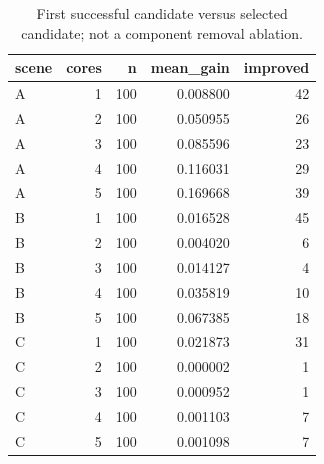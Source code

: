 \begin{table}[htbp]
\centering
\caption{First successful candidate versus selected candidate; not a component removal ablation.}
\begin{tabular}{lrrrr}
\toprule
scene & cores & n & mean\_gain & improved \\
\midrule
A & 1 & 100 & 0.008800 & 42 \\
A & 2 & 100 & 0.050955 & 26 \\
A & 3 & 100 & 0.085596 & 23 \\
A & 4 & 100 & 0.116031 & 29 \\
A & 5 & 100 & 0.169668 & 39 \\
B & 1 & 100 & 0.016528 & 45 \\
B & 2 & 100 & 0.004020 & 6 \\
B & 3 & 100 & 0.014127 & 4 \\
B & 4 & 100 & 0.035819 & 10 \\
B & 5 & 100 & 0.067385 & 18 \\
C & 1 & 100 & 0.021873 & 31 \\
C & 2 & 100 & 0.000002 & 1 \\
C & 3 & 100 & 0.000952 & 1 \\
C & 4 & 100 & 0.001103 & 7 \\
C & 5 & 100 & 0.001098 & 7 \\
\bottomrule
\end{tabular}
\end{table}

